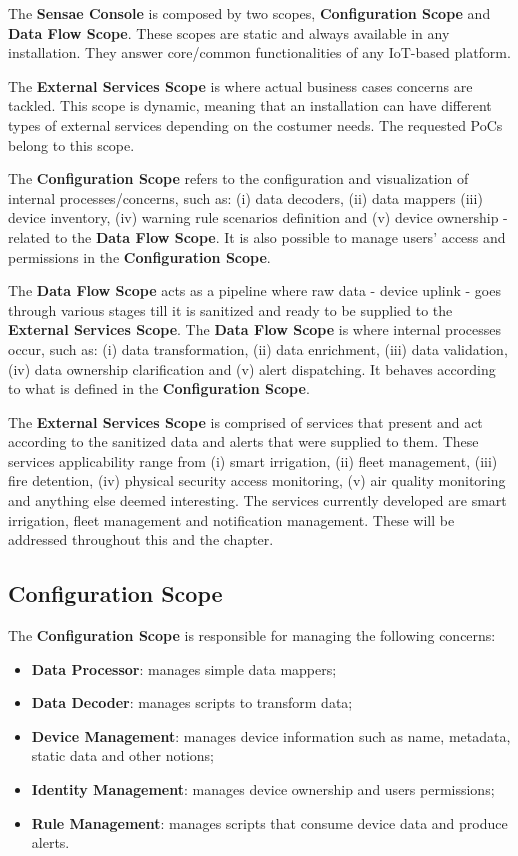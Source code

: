 The \textbf{Sensae Console} is composed by two scopes, \textbf{Configuration Scope} and \textbf{Data Flow Scope}. These scopes are static and always available in any installation. They answer core/common functionalities of any \gls{IoT}-based platform.

The \textbf{External Services Scope} is where actual business cases concerns are tackled. This scope is dynamic, meaning that an installation can have different types of external services depending on the costumer needs. The requested \gls{PoC}s belong to this scope.

The \textbf{Configuration Scope} refers to the configuration and visualization of internal processes/concerns, such as: (i) data decoders, (ii) data mappers (iii) device inventory, (iv) warning rule scenarios definition and (v) device ownership - related to the \textbf{Data Flow Scope}. It is also possible to manage users' access and permissions in the \textbf{Configuration Scope}.

The \textbf{Data Flow Scope} acts as a pipeline where raw data - device uplink - goes through various stages till it is sanitized and ready to be supplied to the \textbf{External Services Scope}. The \textbf{Data Flow Scope} is where internal processes occur, such as: (i) data transformation, (ii) data enrichment, (iii) data validation, (iv) data ownership clarification and (v) alert dispatching. It behaves according to what is defined in the \textbf{Configuration Scope}.

The \textbf{External Services Scope} is comprised of services that present and act according to the sanitized data and alerts that were supplied to them. These services applicability range from (i) smart irrigation, (ii) fleet management, (iii) fire detention, (iv) physical security access monitoring, (v) air quality monitoring and anything else deemed interesting. The services currently developed are smart irrigation, fleet management and notification management. These will be addressed throughout this and the  chapter.

\subsection{Configuration Scope}
\label{subsec:design:system_scopes:configuration_scope}

The \textbf{Configuration Scope} is responsible for managing the following concerns:

\begin{itemize}
   \item \textbf{Data Processor}: manages simple data mappers;
   \item \textbf{Data Decoder}: manages scripts to transform data;
   \item \textbf{Device Management}: manages device information such as name, metadata, static data and other notions;
   \item \textbf{Identity Management}: manages device ownership and users permissions;
   \item \textbf{Rule Management}: manages scripts that consume device data and produce alerts.
\end{itemize}

